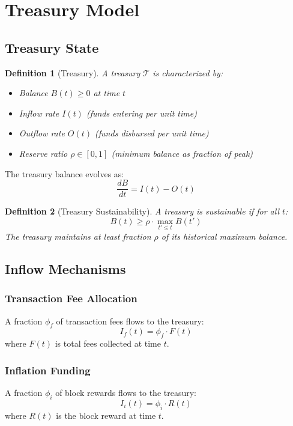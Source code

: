 \documentclass[11pt,a4paper]{article}
\newtheorem{definition}{Definition}
\begin{document}
\section{Treasury Model}

\subsection{Treasury State}

\begin{definition}[Treasury]
A treasury $\mathcal{T}$ is characterized by:
\begin{itemize}
    \item Balance $B(t) \geq 0$ at time $t$
    \item Inflow rate $I(t)$ (funds entering per unit time)
    \item Outflow rate $O(t)$ (funds disbursed per unit time)
    \item Reserve ratio $\rho \in [0, 1]$ (minimum balance as fraction of peak)
\end{itemize}
\end{definition}

The treasury balance evolves as:
\[
\frac{dB}{dt} = I(t) - O(t)
\]

\begin{definition}[Treasury Sustainability]
A treasury is sustainable if for all $t$:
\[
B(t) \geq \rho \cdot \max_{t' \leq t} B(t')
\]
The treasury maintains at least fraction $\rho$ of its historical maximum balance.
\end{definition}

\subsection{Inflow Mechanisms}

\subsubsection{Transaction Fee Allocation}

A fraction $\phi_f$ of transaction fees flows to the treasury:
\[
I_f(t) = \phi_f \cdot F(t)
\]
where $F(t)$ is total fees collected at time $t$.

\subsubsection{Inflation Funding}

A fraction $\phi_i$ of block rewards flows to the treasury:
\[
I_i(t) = \phi_i \cdot R(t)
\]
where $R(t)$ is the block reward at time $t$.
\end{document}
